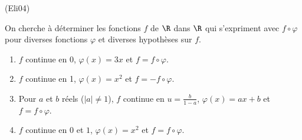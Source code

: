 \begin{tiny}(Eli04)\end{tiny} On cherche à déterminer les fonctions $f$ de $\R$ dans $\R$ qui s'expriment avec $f\circ \varphi$ pour diverses fonctions $\varphi$ et diverses hypothèses sur $f$.
\begin{enumerate}
  \item $f$ continue en 0, $\varphi(x) = 3x$ et $f= f\circ \varphi$.
  \item $f$ continue en 1, $\varphi(x) = x^2$ et $f= - f\circ \varphi$.
  \item Pour $a$ et $b$ réels ($|a|\neq1$), $f$ continue en $u = \frac{b}{1-a}$, $\varphi(x) = ax+b$ et $f= f\circ \varphi$.
  \item $f$ continue en $0$ et $1$, $\varphi(x) = x^2$ et $f = f \circ \varphi$.
\end{enumerate}